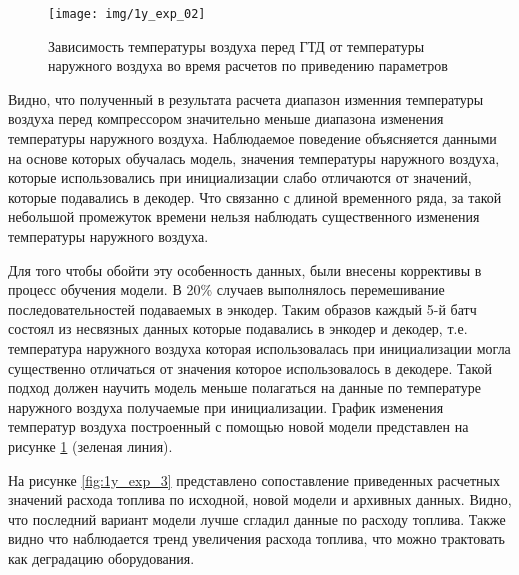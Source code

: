 \documentclass[12pt,a4paper]{article}
\begin{document}
\begin{figure}[htbp]
	\centering\texttt{[image: img/1y\_exp\_02]}
	\caption{Зависимость температуры воздуха перед ГТД от температуры наружного воздуха во время расчетов по приведению параметров}
	\label{fig:1y_exp_02}
\end{figure}


Видно, что полученный в результата расчета диапазон изменния температуры воздуха перед компрессором значительно меньше диапазона изменения температуры наружного воздуха. Наблюдаемое поведение объясняется данными на основе которых обучалась модель, значения температуры наружного воздуха, которые использовались при инициализации слабо отличаются от значений, которые подавались в декодер. Что связанно с длиной временного ряда, за такой небольшой промежуток времени нельзя наблюдать существенного изменения температуры наружного воздуха.


Для того чтобы обойти эту особенность данных, были внесены коррективы в процесс обучения модели. В 20\% случаев выполнялось перемешивание последовательностей подаваемых в энкодер. Таким образов каждый 5-й батч состоял из несвязных данных которые подавались в энкодер и декодер, т.е. температура наружного воздуха которая использовалась при инициализации могла существенно отличаться от значения которое использовалось в декодере. Такой подход должен научить модель меньше полагаться на данные по температуре наружного воздуха получаемые при инициализации. График изменения температур воздуха построенный с помощью новой модели представлен на рисунке \ref{fig:1y_exp_02} (зеленая линия).





На рисунке \ref{fig:1y_exp_3} представлено сопоставление приведенных расчетных значений расхода топлива по исходной, новой модели и архивных данных. Видно, что последний вариант модели лучше сгладил данные по расходу топлива. Также видно что наблюдается тренд увеличения расхода топлива, что можно трактовать как деградацию оборудования. 
\end{document}
